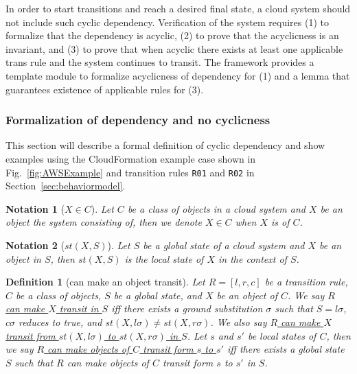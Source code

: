 \documentclass[12pt]{report}
\newtheorem{notation}{Notation}
\newtheorem{definition}{Definition}
\newcommand{\ul}{\underline}
\begin{document}
In order to start transitions and reach a desired final state, a cloud
system should not include such cyclic dependency. Verification of the
system requires (1) to formalize that the dependency is acyclic, (2)
to prove that the acyclicness is an invariant, and (3) to prove that
when acyclic there exists at least one applicable trans rule and the
system continues to transit. The framework provides a template module
to formalize acyclicness of dependency for (1) and a lemma that
guarantees existence of applicable rules for (3).

\subsubsection{Formalization of dependency and no cyclicness}
This section will describe a formal definition of cyclic dependency
and show examples using the CloudFormation example case shown in
Fig.~\ref{fig:AWSExample} and transition rules {\tt R01} and {\tt R02}
in Section~\ref{sec:behaviormodel}.

\begin{notation}[$X \in C$]
Let $C$ be a class of objects in a cloud system and $X$ be an object
the system consisting of, then we denote \ul{$X \in C$} when $X$ is of
$C$.
\end{notation}

\begin{notation}[$st(X,S)$]
Let $S$ be a global state of a cloud system and $X$ be an object in
$S$, then \ul{$st(X,S)$} is the local state of $X$ in the context of
$S$.
\end{notation}

\begin{definition}[can make an object transit]
Let $R = [l,r,c]$ be a transition rule, $C$ be a class of objects, $S$
be a global state, and $X$ be an object of $C$. We say \ul{$R$ can
  make $X$ transit in $S$} iff there exists a ground substitution
$\sigma$ such that $S = l\sigma$, $c\sigma$ reduces to true, and
$st(X,l\sigma) \ne st(X,r\sigma)$. We also say \ul{$R$ can make $X$
  transit from $st(X,l\sigma)$ to $st(X,r\sigma)$ in $S$}.  Let $s$
and $s'$ be local states of $C$, then we say \ul{$R$ can make objects
  of $C$ transit form $s$ to $s'$} iff there exists a global state $S$
such that $R$ can make objects of $C$ transit form $s$ to $s'$ in $S$.
\end{definition}
\end{document}
